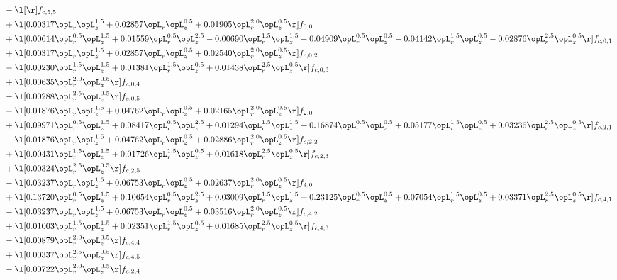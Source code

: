 \begin{alignat}{2}
& - \l[  \r] f_{c,5,5} \nonumber \\ 
& + \l[  0.00317 \opL_r \opL_z^{1.5} +  0.02857 \opL_r \opL_z^{0.5} +  0.01905 \opL_r^{2.0} \opL_z^{0.5}  \r] f_{0,0} \nonumber \\ 
& + \l[  0.00614 \opL_r^{0.5} \opL_z^{1.5} +  0.01559 \opL_r^{0.5} \opL_z^{2.5}   -0.00690 \opL_r^{1.5} \opL_z^{1.5}   -0.04909 \opL_r^{0.5} \opL_z^{0.5}   -0.04142 \opL_r^{1.5} \opL_z^{0.5}   -0.02876 \opL_r^{2.5} \opL_z^{0.5}  \r] f_{c,0,1} \nonumber \\ 
& + \l[  0.00317 \opL_r \opL_z^{1.5} +  0.02857 \opL_r \opL_z^{0.5} +  0.02540 \opL_r^{2.0} \opL_z^{0.5}  \r] f_{c,0,2} \nonumber \\ 
& - \l[  0.00230 \opL_r^{1.5} \opL_z^{1.5} +  0.01381 \opL_r^{1.5} \opL_z^{0.5} +  0.01438 \opL_r^{2.5} \opL_z^{0.5}  \r] f_{c,0,3} \nonumber \\ 
& + \l[  0.00635 \opL_r^{2.0} \opL_z^{0.5}  \r] f_{c,0,4} \nonumber \\ 
& - \l[  0.00288 \opL_r^{2.5} \opL_z^{0.5}  \r] f_{c,0,5} \nonumber \\ 
& - \l[  0.01876 \opL_r \opL_z^{1.5} +  0.04762 \opL_r \opL_z^{0.5} +  0.02165 \opL_r^{2.0} \opL_z^{0.5}  \r] f_{2,0} \nonumber \\ 
& + \l[  0.09971 \opL_r^{0.5} \opL_z^{1.5} +  0.08417 \opL_r^{0.5} \opL_z^{2.5} +  0.01294 \opL_r^{1.5} \opL_z^{1.5} +  0.16874 \opL_r^{0.5} \opL_z^{0.5} +  0.05177 \opL_r^{1.5} \opL_z^{0.5} +  0.03236 \opL_r^{2.5} \opL_z^{0.5}  \r] f_{c,2,1} \nonumber \\ 
& - \l[  0.01876 \opL_r \opL_z^{1.5} +  0.04762 \opL_r \opL_z^{0.5} +  0.02886 \opL_r^{2.0} \opL_z^{0.5}  \r] f_{c,2,2} \nonumber \\ 
& + \l[  0.00431 \opL_r^{1.5} \opL_z^{1.5} +  0.01726 \opL_r^{1.5} \opL_z^{0.5} +  0.01618 \opL_r^{2.5} \opL_z^{0.5}  \r] f_{c,2,3} \nonumber \\ 
& + \l[  0.00324 \opL_r^{2.5} \opL_z^{0.5}  \r] f_{c,2,5} \nonumber \\ 
& - \l[  0.03237 \opL_r \opL_z^{1.5} +  0.06753 \opL_r \opL_z^{0.5} +  0.02637 \opL_r^{2.0} \opL_z^{0.5}  \r] f_{4,0} \nonumber \\ 
& + \l[  0.13720 \opL_r^{0.5} \opL_z^{1.5} +  0.10654 \opL_r^{0.5} \opL_z^{2.5} +  0.03009 \opL_r^{1.5} \opL_z^{1.5} +  0.23125 \opL_r^{0.5} \opL_z^{0.5} +  0.07054 \opL_r^{1.5} \opL_z^{0.5} +  0.03371 \opL_r^{2.5} \opL_z^{0.5}  \r] f_{c,4,1} \nonumber \\ 
& - \l[  0.03237 \opL_r \opL_z^{1.5} +  0.06753 \opL_r \opL_z^{0.5} +  0.03516 \opL_r^{2.0} \opL_z^{0.5}  \r] f_{c,4,2} \nonumber \\ 
& + \l[  0.01003 \opL_r^{1.5} \opL_z^{1.5} +  0.02351 \opL_r^{1.5} \opL_z^{0.5} +  0.01685 \opL_r^{2.5} \opL_z^{0.5}  \r] f_{c,4,3} \nonumber \\ 
& - \l[  0.00879 \opL_r^{2.0} \opL_z^{0.5}  \r] f_{c,4,4} \nonumber \\ 
& + \l[  0.00337 \opL_r^{2.5} \opL_z^{0.5}  \r] f_{c,4,5} \nonumber \\ 
& - \l[  0.00722 \opL_r^{2.0} \opL_z^{0.5}  \r] f_{c,2,4} \nonumber \\ 
\end{alignat} 


